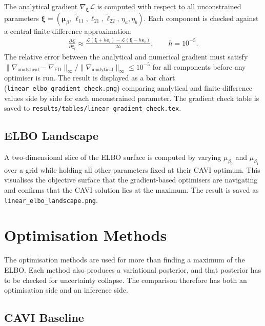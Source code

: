 \documentclass[11pt,a4paper]{article}
\begin{document}
The analytical gradient $\nabla_{\bm{\xi}}\mathcal{L}$ is computed with respect to all unconstrained
parameters $\bm{\xi} = (\bm{\mu}_\beta,\, \tilde{\ell}_{11}, \ell_{21}, \tilde{\ell}_{22},\, \eta_a, \eta_b)$.
Each component is checked against a central finite-difference approximation:
\begin{align}
  \frac{\partial \mathcal{L}}{\partial \xi_i} \approx \frac{\mathcal{L}(\bm{\xi} + h\bm{e}_i) - \mathcal{L}(\bm{\xi} - h\bm{e}_i)}{2h}, \qquad h = 10^{-5}.
\end{align}
The relative error between the analytical and numerical gradient must satisfy
$\|\nabla_{\mathrm{analytical}} - \nabla_{\mathrm{FD}}\|_\infty / \|\nabla_{\mathrm{analytical}}\|_\infty \leq 10^{-5}$
for all components before any optimiser is run.
The result is displayed as a bar chart (\texttt{linear\_elbo\_gradient\_check.png}) comparing analytical and
finite-difference values side by side for each unconstrained parameter.
The gradient check table is saved to \texttt{results/tables/linear\_gradient\_check.tex}.

\subsection{ELBO Landscape}

A two-dimensional slice of the ELBO surface is computed by varying $\mu_{\beta_0}$ and $\mu_{\beta_1}$
over a grid while holding all other parameters fixed at their CAVI optimum.
This visualises the objective surface that the gradient-based optimisers are navigating and confirms
that the CAVI solution lies at the maximum.
The result is saved as \texttt{linear\_elbo\_landscape.png}.

\section{Optimisation Methods}

The optimisation methods are used for more than finding a maximum of the ELBO. Each method also produces a variational posterior, and that posterior has to be checked for uncertainty collapse. The comparison therefore has both an optimisation side and an inference side.

\subsection{CAVI Baseline}
\end{document}
